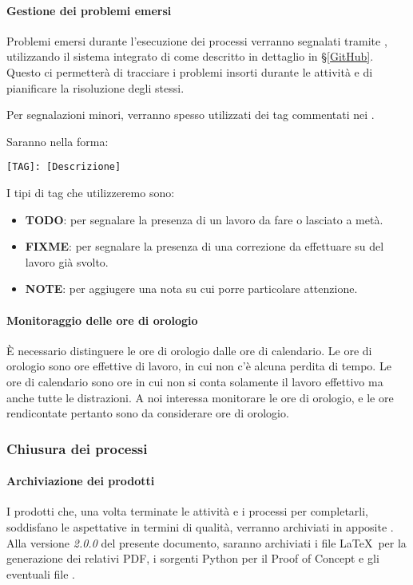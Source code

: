     		\paragraph{Gestione dei problemi emersi}
			Problemi emersi durante l'esecuzione dei processi verranno segnalati tramite , utilizzando il sistema integrato di
			 come descritto in dettaglio in \S\ref{GitHub}. Questo ci permetterà di tracciare i problemi insorti durante le attività
			e di pianificare la risoluzione degli stessi.\par
			Per segnalazioni minori, verranno spesso utilizzati dei tag commentati nei .
			\begin{samepage}
				Saranno nella forma:
				\begin{center}
					\texttt{[TAG]: [Descrizione]}
				\end{center}
			\end{samepage}
			I tipi di tag che utilizzeremo sono:
			\begin{itemize}
				\item \textbf{TODO}: per segnalare la presenza di un lavoro da fare o lasciato a metà.
				\item \textbf{FIXME}: per segnalare la presenza di una correzione da effettuare su del lavoro già svolto.
				\item \textbf{NOTE}: per aggiugere una nota su cui porre particolare attenzione.
			\end{itemize}
		
		\paragraph{Monitoraggio delle ore di orologio}
		È necessario distinguere le ore di orologio dalle ore di calendario. Le ore di orologio sono ore effettive di lavoro, in
		cui non c'è alcuna perdita di tempo. Le ore di calendario sono ore in cui non si conta solamente il lavoro effettivo
		ma anche tutte le distrazioni. A noi interessa monitorare le ore di orologio, e le ore rendicontate pertanto sono da
		considerare ore di orologio.

		\subsubsection{Chiusura dei processi}

    		\paragraph{Archiviazione dei prodotti}
			I prodotti che, una volta terminate le attività e i processi per completarli, soddisfano le aspettative in termini di qualità,
			verranno archiviati in apposite . Alla versione \textit{2.0.0} del presente documento, saranno archiviati
			i file \LaTeX\ per la generazione dei relativi PDF, i sorgenti Python per il Proof of Concept e gli eventuali file .

